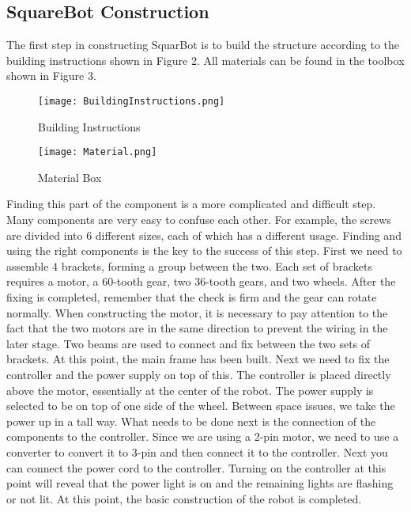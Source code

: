 \documentclass[12pt]{report}
\begin{document}
\subsection{SquareBot Construction}
The first step in constructing SquarBot is to build the structure according to the building instructions shown in Figure 2. All materials can be found in the toolbox shown in Figure 3. 
\begin{figure}[htbp]
	\centering
	\begin{minipage}[t]{0.48\textwidth}
		\centering
		\texttt{[image: BuildingInstructions.png]}
		\caption{Building Instructions}
	\end{minipage}
	\begin{minipage}[t]{0.48\textwidth}
		\centering
		\texttt{[image: Material.png]}
		\caption{Material Box}
	\end{minipage}
\end{figure}
Finding this part of the component is a more complicated and difficult step. Many components are very easy to confuse each other. For example, the screws are divided into 6 different sizes, each of which has a different usage. Finding and using the right components is the key to the success of this step. First we need to assemble 4 brackets, forming a group between the two. Each set of brackets requires a motor, a 60-tooth gear, two 36-tooth gears, and two wheels. After the fixing is completed, remember that the check is firm and the gear can rotate normally. When constructing the motor, it is necessary to pay attention to the fact that the two motors are in the same direction to prevent the wiring in the later stage. Two beams are used to connect and fix between the two sets of brackets. At this point, the main frame has been built. Next we need to fix the controller and the power supply on top of this. The controller is placed directly above the motor, essentially at the center of the robot. The power supply is selected to be on top of one side of the wheel. Between space issues, we take the power up in a tall way. What needs to be done next is the connection of the components to the controller. Since we are using a 2-pin motor, we need to use a converter to convert it to 3-pin and then connect it to the controller. Next you can connect the power cord to the controller. Turning on the controller at this point will reveal that the power light is on and the remaining lights are flashing or not lit. At this point, the basic construction of the robot is completed.
\end{document}
